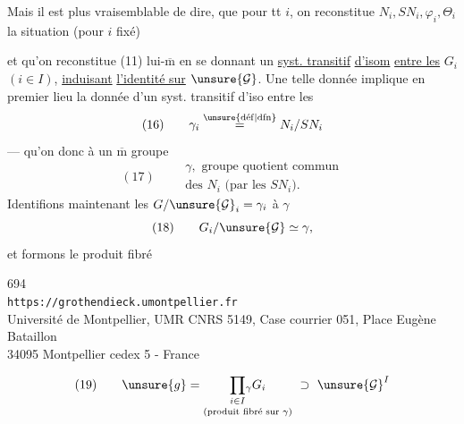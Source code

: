 

Mais il est plus vraisemblable de dire, que pour tt $i$, on reconstitue  $N_i,SN_i,\varphi_i,\Theta_i$ la situation (pour $i$ fixé)

\noindent {}\quad
{}

et qu'on reconstitue (11) lui-$\overline{\mathrm m}$ en se donnant un \uline{syst. transitif} \uline{d'isom} \uline{entre les} $G_i$ $(i\in I)$, \uline{induisant} \uline{l'identité sur} $\unsure{\mathcal G}$. Une telle donnée implique en premier lieu la donnée d'un syst. transitif d'iso entre les
\[
(16)\qquad 
\gamma_i\overset{\unsure{\mathrm{d\acute ef}|\mathrm{dfn}}}{=}N_i/SN_i
\]
--- qu'on  donc à un $\overline{\mathrm m}$ groupe
\[
(17)\qquad 
\begin{gathered}
\gamma,\text{ groupe quotient commun}\\
\text{des }N_i\text{ (par les }SN_i\text{).}
\end{gathered}
\]
Identifions maintenant les $G/\unsure{\mathcal G}_i=\gamma_i$ à $\gamma$
\[
(18)\qquad G_i/\unsure{\mathcal G}\simeq\gamma,
\]
et formons le produit fibré


\begin{center}
694\\
\texttt{https://grothendieck.umontpellier.fr}\\
Université de Montpellier, UMR CNRS 5149, Case courrier 051, Place Eugène Bataillon\\
34095 Montpellier cedex 5 - France
\end{center}



\[
(19)\qquad 
\unsure{g}=\underset{\text{(produit fibré sur }\gamma\text{)}}{\prod_{i\in I}\!{}_{\gamma}G_i}\ \supset\ \unsure{\mathcal G}^I
\]

